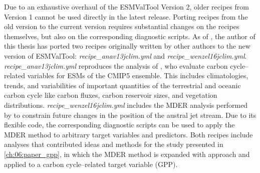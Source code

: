 Due to an exhaustive overhaul of the \ac{ESMValTool} Version 2, older recipes
from Version 1 \autocite{Eyring2016a} cannot be used directly in the latest
release. Porting recipes from the old version to the current version requires
substantial changes on the recipes themselves, but also on the corresponding
diagnostic scripts. As of \TheMonth{}, the author of this thesis has ported two
recipes originally written by other authors to the new version of
\ac{ESMValTool}: \emph{recipe\_anav13jclim.yml} and
\emph{recipe\_wenzel16jclim.yml}. \emph{recipe\_anav13jclim.yml} reproduces the
analysis of \textcite{Anav2013}, who evaluate carbon cycle--related variables
for \acp{ESM} of the \acs{CMIP}5 ensemble. This includes climatologies, trends,
and variabilities of important quantities of the terrestrial and oceanic carbon
cycle like carbon fluxes, carbon reservoir sizes, and vegetation distributions.
\emph{recipe\_wenzel16jclim.yml} includes the \ac{MDER} analysis performed by
\textcite{Wenzel2016a} to constrain future changes in the position of the
austral jet stream. Due to its flexible code, the corresponding diagnostic
scripts can be used to apply the \ac{MDER} method to arbitrary target variables
and predictors. Both recipes include analyses that contributed ideas and
methods for the study presented in \cref{ch:06:paper_gpp}, in which the
\ac{MDER} method is expanded with  approach and applied to a carbon
cycle--related target variable (\ac{GPP}).

